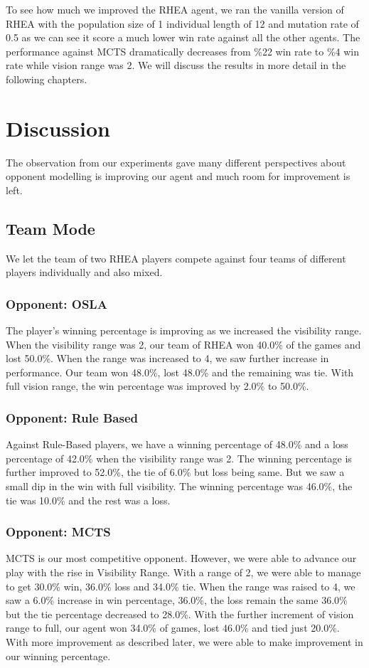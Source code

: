 \documentclass{report}
\begin{document}
To see how much we improved the RHEA agent, we ran the vanilla version of RHEA with the population size of 1 individual length of 12 and mutation rate of 0.5 as we can see it score a much lower win rate against all the other agents. The performance against MCTS dramatically decreases from \%22 win rate to \%4 win rate while vision range was 2. We will discuss the results in more detail in the following chapters.


\chapter{Discussion }
The observation from our experiments gave many different perspectives about opponent modelling is improving our agent and much room for improvement is left.

\section{Team Mode}
We let the team of two RHEA players compete against four teams of different players individually and also mixed. 
\subsection{Opponent: OSLA} 
The player's winning percentage is improving as we increased the visibility range. When the visibility range was 2, our team of RHEA won 40.0\% of the games and lost 50.0\%. When the range was increased to 4, we saw further increase in performance. Our team won 48.0\%, lost 48.0\% and the remaining was tie. With full vision range, the win percentage was improved by 2.0\% to 50.0\%.  

\subsection{Opponent: Rule Based}
Against Rule-Based players, we have a winning percentage of 48.0\% and a loss percentage of 42.0\% when the visibility range was 2. The winning percentage is further improved to 52.0\%, the tie of 6.0\%  but loss being same. But we saw a small dip in the win with full visibility. The winning percentage was 46.0\%, the tie was 10.0\% and the rest was a loss.

\subsection{Opponent: MCTS}
MCTS is our most competitive opponent. However, we were able to advance our play with the rise in Visibility Range. With a range of 2, we were able to manage to get 30.0\% win, 36.0\% loss and 34.0\% tie. When the range was raised to 4, we saw a 6.0\% increase in win percentage, 36.0\%, the loss remain the same 36.0\% but the tie percentage decreased to 28.0\%. With the further increment of vision range to full, our agent won 34.0\% of games, lost 46.0\% and tied just 20.0\%. With more improvement as described later, we were able to make improvement in our winning percentage.
\end{document}
